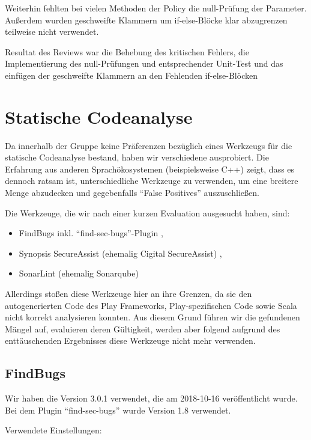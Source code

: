 \documentclass[12pt,DIV14,BCOR10mm,a4paper,parskip=half-,headsepline,headinclude,english,ngerman,bibliography=totocnumbered]{scrreprt}
\begin{document}
Weiterhin fehlten bei vielen Methoden der Policy die null-Prüfung der Parameter. Außerdem wurden geschweifte Klammern um if-else-Blöcke klar abzugrenzen teilweise nicht verwendet.

Resultat des Reviews war die Behebung des kritischen Fehlers, die Implementierung des null-Prüfungen und entsprechender Unit-Test und das einfügen der geschweifte Klammern an den Fehlenden if-else-Blöcken

\section{Statische Codeanalyse}

Da innerhalb der Gruppe keine Präferenzen bezüglich eines Werkzeugs für die statische Codeanalyse bestand, haben wir verschiedene ausprobiert.
Die Erfahrung aus anderen Sprachökosystemen (beispielsweise C++) zeigt, dass es dennoch ratsam ist, unterschiedliche Werkzeuge zu verwenden, um eine breitere Menge abzudecken und gegebenfalls \enquote{False Positives} auszuschließen.

Die Werkzeuge, die wir nach einer kurzen Evaluation ausgesucht haben, sind:

\begin{itemize}
  \item FindBugs \autocite{FindBugs} inkl. \enquote{find-sec-bugs}-Plugin \autocite{FindBugs.FindSecBugs},
  \item Synopsis SecureAssist (ehemalig Cigital SecureAssist) \autocite{SecureAssist},
  \item SonarLint (ehemalig Sonarqube) \autocite{SonarLint}
\end{itemize}

Allerdings stoßen diese Werkzeuge hier an ihre Grenzen, da sie den autogenerierten Code des Play Frameworks, Play-spezifischen Code sowie Scala nicht korrekt analysieren konnten.
Aus diesem Grund führen wir die gefundenen Mängel auf, evaluieren deren Gültigkeit, werden aber folgend aufgrund des enttäuschenden Ergebnisses diese Werkzeuge nicht mehr verwenden.

\subsection{FindBugs}

Wir haben die Version 3.0.1 verwendet, die am 2018-10-16 veröffentlicht wurde.
Bei dem Plugin \enquote{find-sec-bugs} wurde Version 1.8 verwendet.

Verwendete Einstellungen:
\end{document}
